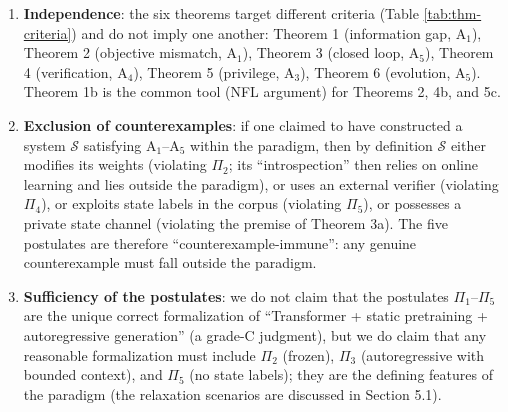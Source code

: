 \begin{enumerate}
\item \textbf{Independence}: the six theorems target different criteria (Table
\ref{tab:thm-criteria}) and do not imply one another: Theorem 1 (information gap,
$\mathrm{A}_1$), Theorem 2 (objective mismatch, $\mathrm{A}_1$), Theorem 3 (closed loop,
$\mathrm{A}_5$), Theorem 4 (verification, $\mathrm{A}_4$), Theorem 5 (privilege,
$\mathrm{A}_3$), Theorem 6 (evolution, $\mathrm{A}_5$). Theorem 1b is the common tool
(NFL argument) for Theorems 2, 4b, and 5c.
\item \textbf{Exclusion of counterexamples}: if one claimed to have constructed a system
$\mathcal{S}$ satisfying $\mathrm{A}_1$--$\mathrm{A}_5$ within the paradigm, then by
definition $\mathcal{S}$ either modifies its weights (violating $\Pi_2$; its ``introspection''
then relies on online learning and lies outside the paradigm), or uses an external verifier
(violating $\Pi_4$), or exploits state labels in the corpus (violating $\Pi_5$), or possesses
a private state channel (violating the premise of Theorem 3a). The five postulates are therefore
``counterexample-immune'': any genuine counterexample must fall outside the paradigm.
\item \textbf{Sufficiency of the postulates}: we do not claim that the postulates
$\Pi_1$--$\Pi_5$ are the unique correct formalization of ``Transformer + static pretraining +
autoregressive generation'' (a grade-C judgment), but we do claim that any reasonable
formalization must include $\Pi_2$ (frozen), $\Pi_3$ (autoregressive with bounded context),
and $\Pi_5$ (no state labels); they are the defining features of the paradigm (the
relaxation scenarios are discussed in Section 5.1).
\end{enumerate}
